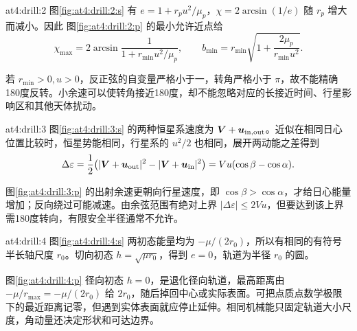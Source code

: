 \begin{drillsolution}{at4:drill:2}
图\ref{fig:at4:drill:2:s} 有 $e=1+r_pu^2/\mu_p$，$\chi=2\arcsin(1/e)$ 随 $r_p$ 增大而减小。因此 图\ref{fig:at4:drill:2:p} 的最小允许近点给
\[\chi_{\max}=2\arcsin\frac1{1+r_{\min}u^2/\mu_p},\qquad
b_{\min}=r_{\min}\sqrt{1+\frac{2\mu_p}{r_{\min}u^2}}.
\]

若 $r_{\min}>0,u>0$，反正弦的自变量严格小于一，转角严格小于 $\pi$，故不能精确180度反转。小余速可以使转角接近180度，却不能忽略对应的长接近时间、行星影响区和其他天体扰动。\end{drillsolution}
\begin{drillsolution}{at4:drill:3}
图\ref{fig:at4:drill:3:s} 的两种恒星系速度为 $\bm V+\bm u_{\rm in,out}$。近似在相同日心位置比较时，恒星势能相同，行星系的 $u^2/2$ 也相同，展开两动能之差得到
\[\Delta\varepsilon=\frac12\big(|\bm V+\bm u_{\rm out}|^2-|\bm V+\bm u_{\rm in}|^2\big)
=Vu(\cos\beta-\cos\alpha).
\]

图\ref{fig:at4:drill:3:p} 的出射余速更朝向行星速度，即 $\cos\beta>\cos\alpha$，才给日心能量增加；反向绕过可能减速。由余弦范围有绝对上界 $|\Delta\varepsilon|\le2Vu$，但要达到该上界需180度转向，有限安全半径通常不允许。\end{drillsolution}
\begin{drillsolution}{at4:drill:4}
图\ref{fig:at4:drill:4:s} 两初态能量均为 $-\mu/(2r_0)$，所以有相同的有符号半长轴尺度 $r_0$。切向初态 $h=\sqrt{\mu r_0}$，得到 $e=0$，轨道为半径 $r_0$ 的圆。

图\ref{fig:at4:drill:4:p} 径向初态 $h=0$，是退化径向轨道，最高距离由 $-\mu/r_{\max}=-\mu/(2r_0)$ 给 $2r_0$，随后掉回中心或实际表面。可把点质点数学极限下的最近距离记零，但遇到实体表面就应停止延伸。相同机械能只固定轨道大小尺度，角动量还决定形状和可达边界。\end{drillsolution}
